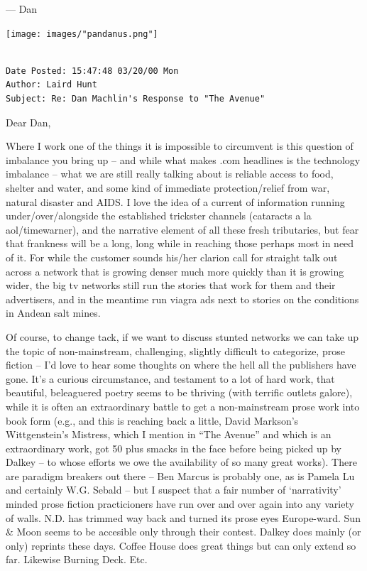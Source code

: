 \documentclass[
]{memoir}
\begin{document}
--- Dan

\begin{center}\texttt{[image: images/"pandanus.png"]}\end{center}

\begin{verbatim}

Date Posted: 15:47:48 03/20/00 Mon
Author: Laird Hunt
Subject: Re: Dan Machlin's Response to "The Avenue"
\end{verbatim}

Dear Dan,

Where I work one of the things it is impossible to circumvent is this
question of imbalance you bring up -- and while what makes .com
headlines is the technology imbalance -- what we are still really
talking about is reliable access to food, shelter and water, and some
kind of immediate protection/relief from war, natural disaster and AIDS.
I love the idea of a current of information running under/over/alongside
the established trickster channels (cataracts a la aol/timewarner), and
the narrative element of all these fresh tributaries, but fear that
frankness will be a long, long while in reaching those perhaps most in
need of it. For while the customer sounds his/her clarion call for
straight talk out across a network that is growing denser much more
quickly than it is growing wider, the big tv networks still run the
stories that work for them and their advertisers, and in the meantime
run viagra ads next to stories on the conditions in Andean salt mines.

Of course, to change tack, if we want to discuss stunted networks we can
take up the topic of non-mainstream, challenging, slightly difficult to
categorize, prose fiction -- I'd love to hear some thoughts on where the
hell all the publishers have gone. It's a curious circumstance, and
testament to a lot of hard work, that beautiful, beleaguered poetry
seems to be thriving (with terrific outlets galore), while it is often
an extraordinary battle to get a non-mainstream prose work into book
form (e.g., and this is reaching back a little, David Markson's
Wittgenstein's Mistress, which I mention in ``The Avenue'' and which is
an extraordinary work, got 50 plus smacks in the face before being
picked up by Dalkey -- to whose efforts we owe the availability of so
many great works). There are paradigm breakers out there -- Ben Marcus
is probably one, as is Pamela Lu and certainly W.G. Sebald -- but I
suspect that a fair number of `narrativity' minded prose fiction
practicioners have run over and over again into any variety of walls.
N.D. has trimmed way back and turned its prose eyes Europe-ward. Sun \&
Moon seems to be accesible only through their contest. Dalkey does
mainly (or only) reprints these days. Coffee House does great things but
can only extend so far. Likewise Burning Deck. Etc.
\end{document}
